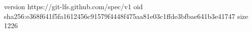 version https://git-lfs.github.com/spec/v1
oid sha256:e368f641f5fa1612456c91579f4448f475aa81e03c1ffde3bfbae641b3e41747
size 1226

